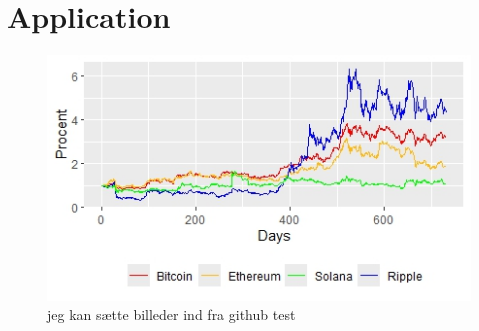\chapter{Application}
\begin{figure}[h]
    \centering
    \includegraphics[width=0.7\linewidth]{1.Projekt_kode/Billeder/PLot of all prices.jpeg}
    \caption{jeg kan sætte billeder ind fra github test}
    \label{fig:enter-label}
\end{figure}